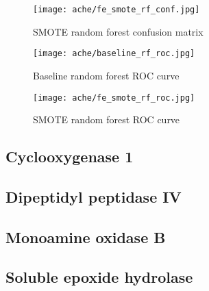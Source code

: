 \begin{figure}[H]
    \begin{center}
        \caption[]{SMOTE random forest confusion matrix}
        \label{fig:ache_smote_rf_conf}
        \texttt{[image: ache/fe\_smote\_rf\_conf.jpg]}
    \end{center}

\end{figure}

\begin{figure}[H]
    \begin{center}
        \caption[]{Baseline random forest ROC curve}
        \label{fig:ache_baseline_rf_roc}
        \texttt{[image: ache/baseline\_rf\_roc.jpg]}
    \end{center}

\end{figure}

\begin{figure}[H]
    \begin{center}
        \caption[]{SMOTE random forest ROC curve}
        \label{fig:ache_smote_rf_roc}
        \texttt{[image: ache/fe\_smote\_rf\_roc.jpg]}
    \end{center}
\end{figure}


\subsection{Cyclooxygenase 1}

\subsection{Dipeptidyl peptidase IV}
\subsection{Monoamine oxidase B}
\subsection{Soluble epoxide hydrolase}